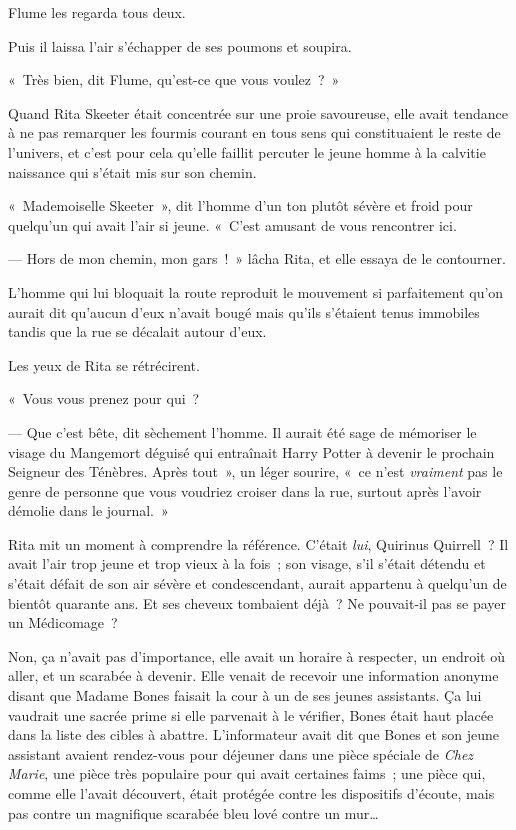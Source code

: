 Flume les regarda tous deux.

Puis il laissa l'air s'échapper de ses poumons et soupira.

«~Très bien, dit Flume, qu'est-ce que vous voulez~?~»


Quand Rita Skeeter était concentrée sur une proie savoureuse, elle avait tendance à ne pas remarquer les fourmis courant en tous sens qui constituaient le reste de l'univers, et c'est pour cela qu'elle faillit percuter le jeune homme à la calvitie naissance qui s'était mis sur son chemin.

«~Mademoiselle Skeeter~», dit l'homme d'un ton plutôt sévère et froid pour quelqu'un qui avait l'air si jeune.
«~C'est amusant de vous rencontrer ici.

--- Hors de mon chemin, mon gars~!~»
lâcha Rita, et elle essaya de le contourner.

L'homme qui lui bloquait la route reproduit le mouvement si parfaitement qu'on aurait dit qu'aucun d'eux n'avait bougé mais qu'ils s'étaient tenus immobiles tandis que la rue se décalait autour d'eux.

Les yeux de Rita se rétrécirent.

«~Vous vous prenez pour qui~?

--- Que c'est bête, dit sèchement l'homme.
Il aurait été sage de mémoriser le visage du Mangemort déguisé qui entraînait Harry Potter à devenir le prochain Seigneur des Ténèbres.
Après tout~», un léger sourire, «~ce n'est \emph{vraiment} pas le genre de personne que vous voudriez croiser dans la rue, surtout après l'avoir démolie dans le journal.~»

Rita mit un moment à comprendre la référence.
C'était \emph{lui}, Quirinus Quirrell~?
Il avait l'air trop jeune et trop vieux à la fois~; son visage, s'il s'était détendu et s'était défait de son air sévère et condescendant, aurait appartenu à quelqu'un de bientôt quarante ans.
Et ses cheveux tombaient déjà~?
Ne pouvait-il pas se payer un Médicomage~?

Non, ça n'avait pas d'importance, elle avait un horaire à respecter, un endroit où aller, et un scarabée à devenir.
Elle venait de recevoir une information anonyme disant que Madame Bones faisait la cour à un de ses jeunes assistants.
Ça lui vaudrait une sacrée prime si elle parvenait à le vérifier, Bones était haut placée dans la liste des cibles à abattre.
L'informateur avait dit que Bones et son jeune assistant avaient rendez-vous pour déjeuner dans une pièce spéciale de \emph{Chez Marie}, une pièce très populaire pour qui avait certaines faims~; une pièce qui, comme elle l'avait découvert, était protégée contre les dispositifs d'écoute, mais pas contre un magnifique scarabée bleu lové contre un mur…

